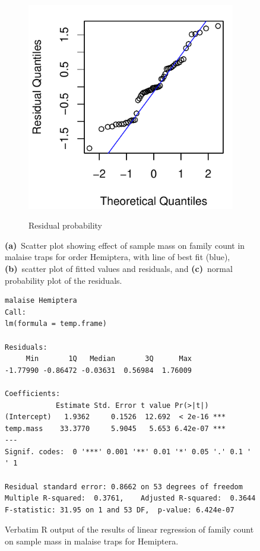 \documentclass[10pt,letterpaper,twocolumn]{article}
\begin{document}
\begin{figure}[h]
\begin{subfigure}[b]{0.15\textwidth}
		\label{fig:malaise_hemiptera_resid}
	\end{subfigure}
	~
	\begin{subfigure}[b]{0.15\textwidth}
		\caption{Residual probability}
		\includegraphics[width=\textwidth]{plots/mass-vs-count/qqplot/2015_malaise_Hemiptera_qqplot.pdf}
		\label{fig:malaise_hemiptera_qqplot}
	\end{subfigure}
	\caption{\textbf{(a)}~Scatter plot showing effect of sample mass on family count in malaise traps for order Hemiptera, with line of best fit (blue), \textbf{(b)}~scatter plot of fitted values and residuals, and \textbf{(c)}~normal probability plot of the residuals.}
	\label{fig:malaise_hemiptera}
	\smallskip
	\nointerlineskip
	\hrulefill
\end{figure}

\begin{figure}[h]
	\lstset{numbers=left}
	\lstset{xleftmargin=5mm,framexleftmargin=5mm}
	\begin{lstlisting}
malaise Hemiptera
Call:
lm(formula = temp.frame)

Residuals:
     Min       1Q   Median       3Q      Max 
-1.77990 -0.86472 -0.03631  0.56984  1.76009 

Coefficients:
            Estimate Std. Error t value Pr(>|t|)
(Intercept)   1.9362     0.1526  12.692  < 2e-16 ***
temp.mass    33.3770     5.9045   5.653 6.42e-07 ***
---
Signif. codes:  0 '***' 0.001 '**' 0.01 '*' 0.05 '.' 0.1 ' ' 1

Residual standard error: 0.8662 on 53 degrees of freedom
Multiple R-squared:  0.3761,	Adjusted R-squared:  0.3644 
F-statistic: 31.95 on 1 and 53 DF,  p-value: 6.424e-07
	\end{lstlisting}
	\caption{Verbatim R output of the results of linear regression of family count on sample mass in malaise traps for Hemiptera.}
	\label{fig:malaise_hemiptera_regression}
	\smallskip
	\nointerlineskip
	\hrulefill
\end{figure}
\end{document}
